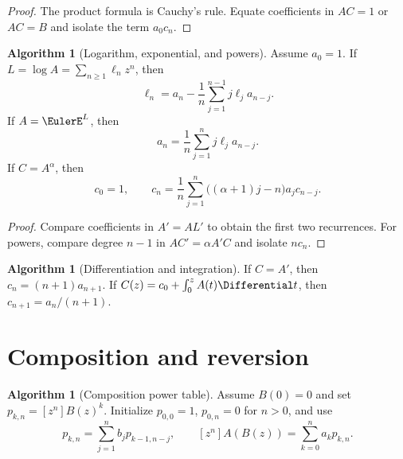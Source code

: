 \documentclass[11pt,a4paper,oneside,openany]{book}
\theoremstyle{definition}
\newtheorem{algorithm}[theorem]{Algorithm}
\theoremstyle{remark}
\begin{document}
\begin{proof}
The product formula is Cauchy's rule.  Equate coefficients in $AC=1$ or
$AC=B$ and isolate the term $a_0c_n$.
\end{proof}

\begin{algorithm}[Logarithm, exponential, and powers]
\label{alg:merged-exp-log-power}
Assume $a_0=1$.  If $L=\log A=\sum_{n\geq1}\ell_nz^n$, then
\begin{equation}
 \ell_n=a_n-\frac1n\sum_{j=1}^{n-1}j\ell_ja_{n-j}.                 \label{eq:merged-alg-log}
\end{equation}
If $A=\EulerE^L$, then
\begin{equation}
 a_n=\frac1n\sum_{j=1}^{n}j\ell_ja_{n-j}.                         \label{eq:merged-alg-exp}
\end{equation}
If $C=A^\alpha$, then
\begin{equation}
 c_0=1,\qquad
 c_n=\frac1n\sum_{j=1}^{n}\bigl((\alpha+1)j-n\bigr)a_jc_{n-j}.    \label{eq:merged-alg-power}
\end{equation}
\end{algorithm}

\begin{proof}
Compare coefficients in $A'=AL'$ to obtain the first two recurrences.  For
powers, compare degree $n-1$ in $AC'=\alpha A'C$ and isolate $nc_n$.
\end{proof}

\begin{algorithm}[Differentiation and integration]
If $C=A'$, then $c_n=(n+1)a_{n+1}$.  If
$C(z)=c_0+\int_0^zA(t)\Differential t$, then $c_{n+1}=a_n/(n+1)$.
\end{algorithm}

\section{Composition and reversion}

\begin{algorithm}[Composition power table]
\label{alg:merged-composition}
Assume $B(0)=0$ and set $p_{k,n}=[z^n]B(z)^k$.  Initialize
$p_{0,0}=1$, $p_{0,n}=0$ for $n>0$, and use
\begin{equation}
 p_{k,n}=\sum_{j=1}^{n}b_jp_{k-1,n-j},\qquad
 [z^n]A(B(z))=\sum_{k=0}^{n}a_kp_{k,n}.                            \label{eq:merged-alg-composition}
\end{equation}
\end{algorithm}
\end{document}
